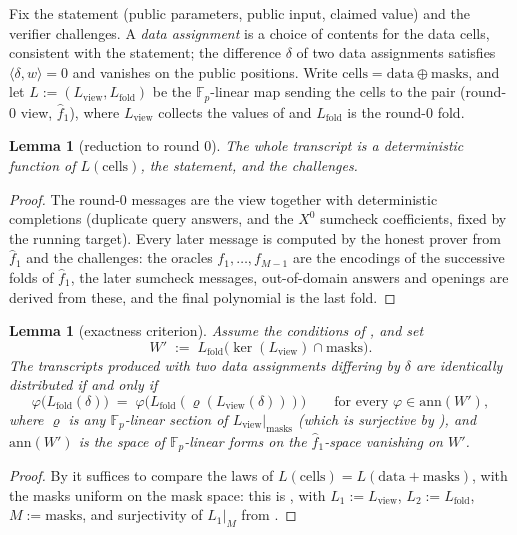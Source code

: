 \documentclass{article}
\newcommand{\Fp}{\mathbb{F}_p}
\newtheorem{lemma}[theorem]{Lemma}
\theoremstyle{definition}
\begin{document}
Fix the statement (public parameters, public input, claimed value) and the verifier challenges. A \emph{data assignment} is a choice of contents for the data cells, consistent with the statement; the difference $\delta$ of two data assignments satisfies $\langle \delta, w \rangle = 0$ and vanishes on the public positions. Write $\mathrm{cells} = \mathrm{data} \oplus \mathrm{masks}$, and let $L := (L_{\mathrm{view}}, L_{\mathrm{fold}})$ be the $\Fp$-linear map sending the cells to the pair (round-0 view, $\hat{f}_1$), where $L_{\mathrm{view}}$ collects the values of  and $L_{\mathrm{fold}}$ is the round-0 fold.

\begin{lemma}[reduction to round 0]\label{lem:reduction}
The whole transcript is a deterministic function of $L(\mathrm{cells})$, the statement, and the challenges.
\end{lemma}

\begin{proof}
The round-0 messages are the view together with deterministic completions (duplicate query answers, and the $X^0$ sumcheck coefficients, fixed by the running target). Every later message is computed by the honest prover from $\hat{f}_1$ and the challenges: the oracles $f_1, \dots, f_{M-1}$ are the encodings of the successive folds of $\hat{f}_1$, the later sumcheck messages, out-of-domain answers and openings are derived from these, and the final polynomial is the last fold.
\end{proof}

\begin{lemma}[exactness criterion]\label{lem:criterion}
Assume the conditions of , and set
\[
W' \;:=\; L_{\mathrm{fold}}\big(\ker(L_{\mathrm{view}}) \cap \mathrm{masks}\big) .
\]
The transcripts produced with two data assignments differing by $\delta$ are identically distributed if and only if
\[
\varphi\big(L_{\mathrm{fold}}(\delta)\big) \;=\; \varphi\big(L_{\mathrm{fold}}(\varrho(L_{\mathrm{view}}(\delta)))\big) \qquad \text{for every } \varphi \in \mathrm{ann}(W') ,
\]
where $\varrho$ is any $\Fp$-linear section of $L_{\mathrm{view}}|_{\mathrm{masks}}$ (which is surjective by ), and $\mathrm{ann}(W')$ is the space of $\Fp$-linear forms on the $\hat{f}_1$-space vanishing on $W'$.
\end{lemma}

\begin{proof}
By  it suffices to compare the laws of $L(\mathrm{cells}) = L(\mathrm{data} + \mathrm{masks})$, with the masks uniform on the mask space: this is , with $L_1 := L_{\mathrm{view}}$, $L_2 := L_{\mathrm{fold}}$, $M := \mathrm{masks}$, and surjectivity of $L_1|_M$ from .
\end{proof}
\end{document}
